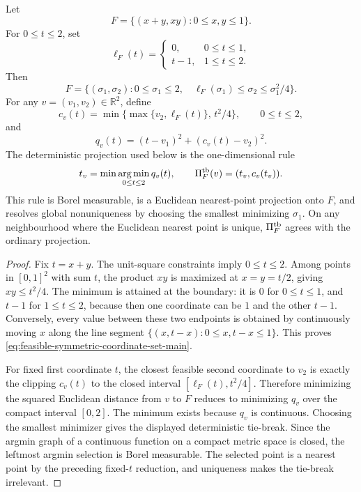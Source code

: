 \begin{lemma}\label{lem:feasible-set-computable-projection-main}
Let
\[
F=\{(x+y,xy):0\le x,y\le1\}.
\]
For \(0\le t\le2\), set
\[
\ell_F(t)=
\begin{cases}
0,&0\le t\le1,\\
t-1,&1\le t\le2 .
\end{cases}
\]
Then
\begin{equation}\label{eq:feasible-symmetric-coordinate-set-main}
F=\{(\sigma_1,\sigma_2):0\le\sigma_1\le2,\quad
\ell_F(\sigma_1)\le\sigma_2\le\sigma_1^2/4\}.
\end{equation}
For any \(v=(v_1,v_2)\in\mathbb R^2\), define
\[
c_v(t)
=\min\{\max\{v_2,\ell_F(t)\},\,t^2/4\},
\qquad 0\le t\le2,
\]
and
\[
q_v(t)=(t-v_1)^2+(c_v(t)-v_2)^2 .
\]
The deterministic projection used below is the one-dimensional rule
\begin{equation}\label{eq:computable-projection-rule-main}
t_v=\min\operatorname*{arg\,min}_{0\le t\le2}q_v(t),
\qquad
\Pi_F^{\rm tb}(v)=(t_v,c_v(t_v)).
\end{equation}
This rule is Borel measurable, is a Euclidean nearest-point projection onto
\(F\), and resolves global nonuniqueness by choosing the smallest minimizing
\(\sigma_1\).  On any neighbourhood where the Euclidean nearest point is
unique, \(\Pi_F^{\rm tb}\) agrees with the ordinary projection.
\end{lemma}

\begin{proof}
Fix \(t=x+y\).  The unit-square constraints imply \(0\le t\le2\).  Among
points in \([0,1]^2\) with sum \(t\), the product \(xy\) is maximized at
\(x=y=t/2\), giving \(xy\le t^2/4\).  The minimum is attained at the boundary:
it is \(0\) for \(0\le t\le1\), and \(t-1\) for \(1\le t\le2\), because then
one coordinate can be \(1\) and the other \(t-1\).  Conversely, every value
between these two endpoints is obtained by continuously moving \(x\) along the
line segment \(\{(x,t-x):0\le x,t-x\le1\}\).  This proves
\eqref{eq:feasible-symmetric-coordinate-set-main}.

For fixed first coordinate \(t\), the closest feasible second coordinate to
\(v_2\) is exactly the clipping \(c_v(t)\) to the closed interval
\([\ell_F(t),t^2/4]\).  Therefore minimizing the squared Euclidean distance
from \(v\) to \(F\) reduces to minimizing \(q_v\) over the compact interval
\([0,2]\).  The minimum exists because \(q_v\) is continuous.  Choosing the
smallest minimizer gives the displayed deterministic tie-break.  Since the
argmin graph of a continuous function on a compact metric space is closed, the
leftmost argmin selection is Borel measurable.  The selected point is a nearest
point by the preceding fixed-\(t\) reduction, and uniqueness makes the
tie-break irrelevant.
\end{proof}


